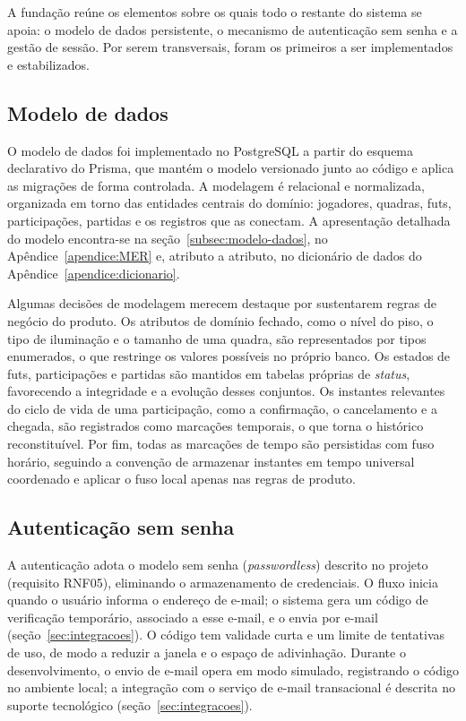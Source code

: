     A fundação reúne os elementos sobre os quais todo o restante do sistema se apoia: o modelo de dados persistente, o mecanismo de autenticação sem senha e a gestão de sessão. Por serem transversais, foram os primeiros a ser implementados e estabilizados.

    \subsection{Modelo de dados}
      O modelo de dados foi implementado no PostgreSQL a partir do esquema declarativo do Prisma, que mantém o modelo versionado junto ao código e aplica as migrações de forma controlada. A modelagem é relacional e normalizada, organizada em torno das entidades centrais do domínio: jogadores, quadras, futs, participações, partidas e os registros que as conectam. A apresentação detalhada do modelo encontra-se na seção~\ref{subsec:modelo-dados}, no Apêndice~\ref{apendice:MER} e, atributo a atributo, no dicionário de dados do Apêndice~\ref{apendice:dicionario}.

      Algumas decisões de modelagem merecem destaque por sustentarem regras de negócio do produto. Os atributos de domínio fechado, como o nível do piso, o tipo de iluminação e o tamanho de uma quadra, são representados por tipos enumerados, o que restringe os valores possíveis no próprio banco. Os estados de futs, participações e partidas são mantidos em tabelas próprias de \textit{status}, favorecendo a integridade e a evolução desses conjuntos. Os instantes relevantes do ciclo de vida de uma participação, como a confirmação, o cancelamento e a chegada, são registrados como marcações temporais, o que torna o histórico reconstituível. Por fim, todas as marcações de tempo são persistidas com fuso horário, seguindo a convenção de armazenar instantes em tempo universal coordenado e aplicar o fuso local apenas nas regras de produto.

    \subsection{Autenticação sem senha}
      A autenticação adota o modelo sem senha (\textit{passwordless}) descrito no projeto (requisito RNF05), eliminando o armazenamento de credenciais. O fluxo inicia quando o usuário informa o endereço de e-mail; o sistema gera um código de verificação temporário, associado a esse e-mail, e o envia por e-mail (seção~\ref{sec:integracoes}). O código tem validade curta e um limite de tentativas de uso, de modo a reduzir a janela e o espaço de adivinhação. Durante o desenvolvimento, o envio de e-mail opera em modo simulado, registrando o código no ambiente local; a integração com o serviço de e-mail transacional é descrita no suporte tecnológico (seção~\ref{sec:integracoes}).

